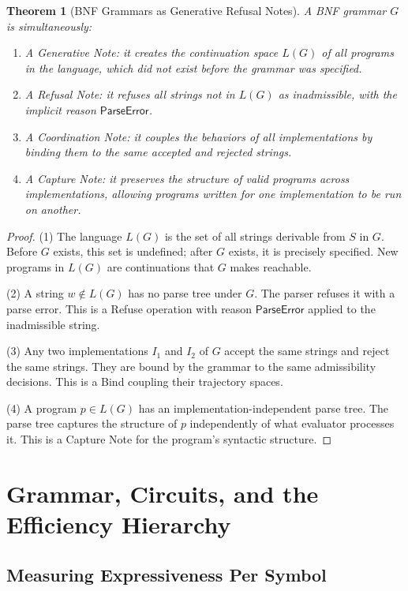 \documentclass[12pt, a4paper, openany]{book}
\theoremstyle{plain}
\newtheorem{theorem}{Theorem}[chapter]
\theoremstyle{definition}
\theoremstyle{remark}
\begin{document}
\begin{theorem}[BNF Grammars as Generative Refusal Notes]
A BNF grammar $G$ is simultaneously:
\begin{enumerate}
\item A \emph{Generative Note}: it creates the continuation space $L(G)$ of all
programs in the language, which did not exist before the grammar was specified.
\item A \emph{Refusal Note}: it refuses all strings not in $L(G)$ as
inadmissible, with the implicit reason $\mathsf{ParseError}$.
\item A \emph{Coordination Note}: it couples the behaviors of all
implementations by binding them to the same accepted and rejected strings.
\item A \emph{Capture Note}: it preserves the structure of valid programs across
implementations, allowing programs written for one implementation to be run
on another.
\end{enumerate}
\end{theorem}

\begin{proof}
(1) The language $L(G)$ is the set of all strings derivable from $S$ in $G$.
Before $G$ exists, this set is undefined; after $G$ exists, it is precisely
specified. New programs in $L(G)$ are continuations that $G$ makes reachable.

(2) A string $w \notin L(G)$ has no parse tree under $G$. The parser refuses
it with a parse error. This is a Refuse operation with reason
$\mathsf{ParseError}$ applied to the inadmissible string.

(3) Any two implementations $I_1$ and $I_2$ of $G$ accept the same strings and
reject the same strings. They are bound by the grammar to the same
admissibility decisions. This is a Bind coupling their trajectory spaces.

(4) A program $p \in L(G)$ has an implementation-independent parse tree. The
parse tree captures the structure of $p$ independently of what evaluator
processes it. This is a Capture Note for the program's syntactic structure.
\end{proof}

\chapter{Grammar, Circuits, and the Efficiency Hierarchy}

\section{Measuring Expressiveness Per Symbol}
\end{document}
